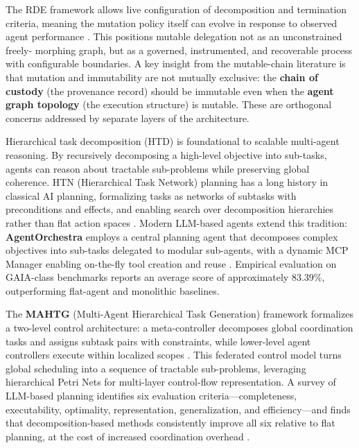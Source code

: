 The RDE framework allows live configuration of decomposition and termination criteria, meaning the mutation policy itself can evolve in response to observed agent performance \cite{rde_2025}. This positions mutable delegation not as an unconstrained freely- morphing graph, but as a governed, instrumented, and recoverable process with configurable boundaries. A key insight from the mutable-chain literature is that mutation and immutability are not mutually exclusive: the \textbf{chain of custody} (the provenance record) should be immutable even when the \textbf{agent graph topology} (the execution structure) is mutable. These are orthogonal concerns addressed by separate layers of the architecture.


Hierarchical task decomposition (HTD) is foundational to scalable multi-agent reasoning. By recursively decomposing a high-level objective into sub-tasks, agents can reason about tractable sub-problems while preserving global coherence. HTN (Hierarchical Task Network) planning has a long history in classical AI planning, formalizing tasks as networks of subtasks with preconditions and effects, and enabling search over decomposition hierarchies rather than flat action spaces \cite{htn_survey_2014, panda_framework_2020}. Modern LLM-based agents extend this tradition: \textbf{AgentOrchestra} employs a central planning agent that decomposes complex objectives into sub-tasks delegated to modular sub-agents, with a dynamic MCP Manager enabling on-the-fly tool creation and reuse \cite{agentorchestra_2025}. Empirical evaluation on GAIA-class benchmarks reports an average score of approximately 83.39\%, outperforming flat-agent and monolithic baselines.

The \textbf{MAHTG} (Multi-Agent Hierarchical Task Generation) framework formalizes a two-level control architecture: a meta-controller decomposes global coordination tasks and assigns subtask pairs with constraints, while lower-level agent controllers execute within localized scopes \cite{mahtg_2025}. This federated control model turns global scheduling into a sequence of tractable sub-problems, leveraging hierarchical Petri Nets for multi-layer control-flow representation. A survey of LLM-based planning identifies six evaluation criteria—completeness, executability, optimality, representation, generalization, and efficiency—and finds that decomposition-based methods consistently improve all six relative to flat planning, at the cost of increased coordination overhead \cite{llm_planning_survey_2025}.

